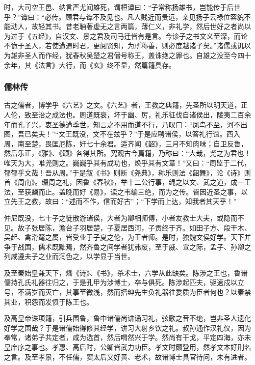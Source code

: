 \documentclass[]{article}
\begin{document}
时，大司空王邑、纳言严尤闻雄死，谓桓谭曰：``子常称扬雄书，岂能传于后世乎？''谭曰：``必传。顾君与谭不及见也。凡人贱近而贵远，亲见扬子云禄位容貌不能动人，故轻其书。昔老聃著虚无之言两篇，薄仁义，非礼学，然后世好之者尚以为过于《五经》，自汉文、景之君及司马迁皆有是言。今诊子之书文义至深，而论不诡于圣人，若使遭遇时君，更阅贤知，为所称善，则必度越诸子矣。''诸儒或讥以为雄非圣人而作经，犹春秋吴楚之君僣号称王，盖诛绝之罪也。自雄之没至今四十余年，其《法言》大行，而《玄》终不显，然篇籍具存。

\hypertarget{header-n5941}{%
\subsubsection{儒林传}\label{header-n5941}}

古之儒者，博学乎《六艺》之文。《六艺》者，王教之典籍，先圣所以明天道，正人伦，致至治之成法也。周道既衰，坏于幽、厉，礼乐征伐自诸侯出，陵夷二百余年而孔子兴，衷圣德遭季世，知言之不用而道不行，乃叹曰：``凤鸟不至，河不出图，吾已矣夫！''``文王既没，文不在兹乎？''于是应聘诸侯，以答礼行谊。西入周，南至楚，畏匡厄陈，奸七十余君。适齐闻《韶》，三月不知肉味；自卫反鲁，然后乐正，《雅》、《颂》各得其所。究观古今篇籍，乃称曰：``大哉，尧之为君也！唯天为大，唯尧则之。巍巍乎其有成功也，焕乎其有文章！''又曰：``周监于二代，郁郁乎文哉！吾从周。''于是叙《书》则断《尧典》，称乐则法《韶舞》，论《诗》则首《周南》。缀周之礼，因鲁《春秋》，举十二公行事，绳之以文、武之道，成一王法，至获麟而止。盖晚而好《易》，读之韦编三绝，而为之传。皆因近圣之事，以立先王之教，故曰：``述而不作，信而好古''；``下学而上达，知我者其天乎！''

仲尼既没，七十子之徒散游诸侯，大者为卿相师傅，小者友教士大夫，或隐而不见。故子张居陈，澹台子羽居楚，子夏居西河，子贡终于齐。如田子方、段干木、吴起、禽滑氂之属，皆受业于子夏之伦，为王者师。是时，独魏文侯好学。天下并争于战国，儒术既黜焉，然齐鲁之间学者犹弗废，至于威、宣之际，孟子、孙卿之列咸遵夫子之业而润色之，以学显于当世。

及至秦始皇兼天下，燔《诗》、《书》，杀术士，六学从此缺矣。陈涉之王也，鲁诸儒持孔氏礼器往归之，于是孔甲为涉博士，卒与俱死。陈涉起匹夫，驱適戍以立号，不满岁而灭亡，其事至微浅，然而搢绅先生负礼器往委质为臣者何也？以秦禁其业，积怨而发愤于陈王也。

及高皇帝诛项籍，引兵围鲁，鲁中诸儒尚讲诵习礼，弦歌之音不绝，岂非圣人遗化好学之国哉？于是诸儒始得修其经学，讲习大射乡饮之礼。叔孙通作汉礼仪，因为奉常，诸弟子共定者，咸为选首，然后喟然兴于学。然尚有干戈，平定四海，亦未皇庠序之事也。孝惠、高后时，公卿皆武力功臣。孝文时颇登用，然孝文本好刑名之言。及至孝景，不任儒，窦太后又好黄、老术，故诸博士具官待问，未有进者。
\end{document}
